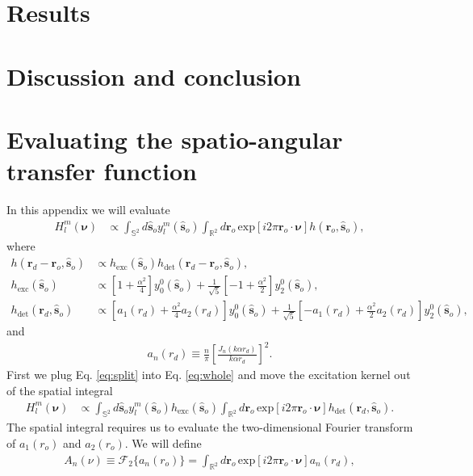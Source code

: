 \documentclass{osa-article}
\providecommand{\ro}[1]{\mathbf{\mathbf{r}}_o}
\providecommand{\so}[1]{\mathbf{\hat{s}}_o}
\providecommand{\rd}[1]{\mathbf{r}_d}
\providecommand{\mbb}[1]{\mathbb{#1}}
\providecommand{\bs}[1]{\boldsymbol{#1}}
\begin{document}
\section{Results}

\section{Discussion and conclusion}


\appendix
\section{Evaluating the spatio-angular transfer function}
In this appendix we will evaluate 
\begin{align}
    H_l^m(\bs{\nu}) &\propto \int_{\mbb{S}^2}d\so{}y_l^m(\so{})\int_{\mbb{R}^2}d\ro{}\,\text{exp}\left[i2\pi \ro{}\cdot\bs{\nu}\right]h(\ro{}, \so{}),\label{eq:whole}
\end{align}
where
\begin{align}
  h(\rd{} - \ro{}, \so{}) &\propto h_{\text{exc}}(\so{})h_{\text{det}}(\rd{} - \ro{}, \so{}),\label{eq:split}\\ 
  h_{\text{exc}}(\so{}) &\propto \left[1 + \frac{\alpha^2}{4}\right]y_0^0(\so{}) + \frac{1}{\sqrt{5}}\left[-1 + \frac{\alpha^2}{2}\right]y_2^0(\so{}),\\  
  h_{\text{det}}(\rd{}, \so{}) &\propto \left[a_1( r_d) + \frac{\alpha^2}{4} a_2( r_d)\right]y_0^0(\so{}) + \frac{1}{\sqrt{5}}\left[- a_1( r_d) + \frac{\alpha^2}{2} a_2( r_d)\right]y_2^0(\so{}),
\end{align}
and
\begin{align}
    a_n(r_d) \equiv \frac{n}{\pi}\left[\frac{J_n(k\alpha r_d)}{k\alpha r_d}\right]^2. 
\end{align}
First we plug Eq. \ref{eq:split} into Eq. \ref{eq:whole} and move the excitation
kernel out of the spatial integral
\begin{align}
    H_l^m(\bs{\nu}) &\propto \int_{\mbb{S}^2}d\so{}y_l^m(\so{})h_{\text{exc}}(\so{})\int_{\mbb{R}^2}d\ro{}\,\text{exp}\left[i2\pi \ro{}\cdot\bs{\nu}\right]h_{\text{det}}(\rd{}, \so{}). \label{eq:satf}
\end{align}
The spatial integral requires us to evaluate the two-dimensional Fourier
transform of $a_1(r_o)$ and $a_2(r_o)$. We will define
\begin{align}
  A_n(\nu) \equiv \mathcal{F}_2\{a_n(r_o)\} =  \int_{\mbb{R}^2}d\ro{}\,\text{exp}\left[i2\pi \ro{}\cdot\bs{\nu}\right] a_n(r_d), \label{eq:ftA}
\end{align}
\end{document}
